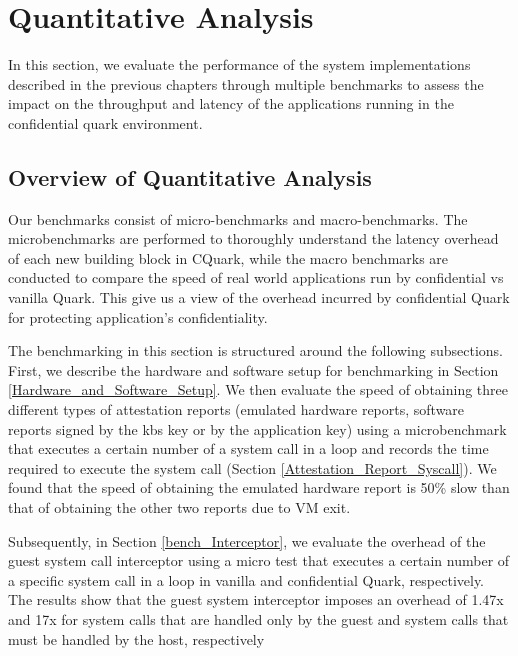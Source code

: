 

\section{Quantitative Analysis}
In this section, we evaluate the performance of the system implementations described in the previous chapters through multiple benchmarks to assess the impact on the throughput and latency of the applications running in the confidential quark environment.


\subsection{Overview of Quantitative Analysis}

Our benchmarks  consist of micro-benchmarks and macro-benchmarks. The microbenchmarks are performed to  thoroughly understand the latency overhead of each new building block in CQuark, while the macro benchmarks are conducted to compare the speed of 
real world applications run by confidential vs vanilla Quark. This give us a view of the overhead incurred by confidential Quark for protecting application’s confidentiality.


The benchmarking in this section is structured around the following subsections. First, we describe the hardware and software setup for benchmarking in Section \ref{Hardware_and_Software_Setup}. We then evaluate the speed of obtaining three different types of attestation reports (emulated hardware 
reports, software reports signed by the kbs key or by the application key) using a microbenchmark that executes a certain number of a system call in a loop and records the time required to execute the system call (Section \ref{Attestation_Report_Syscall}). We found that the speed of obtaining the 
emulated hardware report is 50\% slow than that of obtaining the other two reports due to VM exit. 

Subsequently, in Section \ref{bench_Interceptor}, we evaluate the overhead of the guest system call interceptor using a micro test that executes a certain number of a specific system call in a loop in vanilla and confidential Quark, respectively. The results show that the guest system interceptor imposes an overhead of 1.47x 
and 17x for system calls that are handled only by the guest and system calls that must be handled by the host, respectively

